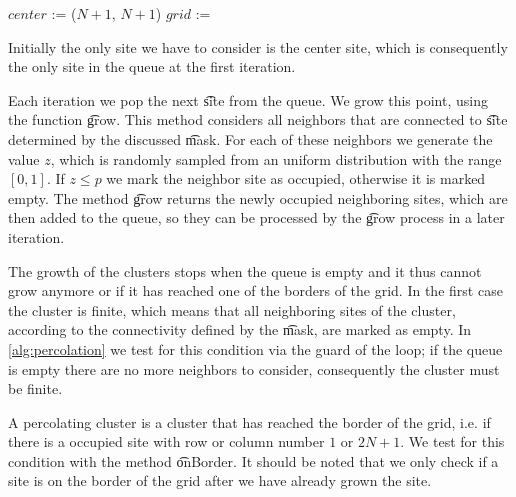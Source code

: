 \begin{algorithm}[t]
	\SetAlgoShortEnd
	\DontPrintSemicolon
	\BlankLine

	$center$ := ($N + 1$, $N + 1$)\; 
	\; 
	$grid$ := \; 

	\; 
	\caption{$(mask, N, p)$\label{alg:percolation}}
\end{algorithm}

Initially the only site we have to consider is the center site, which is consequently the only site in the queue at the first iteration.

Each iteration we pop the next \t{site} from the queue. We grow this point, using the function \t{grow}. This method considers all neighbors that are connected to \t{site} determined by the discussed \t{mask}. For each of these neighbors we generate the value $z$, which is randomly sampled from an uniform distribution with the range $[0,1]$. If $z \leq p$ we mark the neighbor site as occupied, otherwise it is marked empty. The method \t{grow} returns the newly occupied neighboring sites, which are then added to the queue, so they can be processed by the \t{grow} process in a later iteration.

The growth of the clusters stops when the queue is empty and it thus cannot grow anymore or if it has reached one of the borders of the grid. In the first case the cluster is finite, which means that all neighboring sites of the cluster, according to the connectivity defined by the \t{mask}, are marked as empty. In \cref{alg:percolation} we test for this condition via the guard of the loop; if the queue is empty there are no more neighbors to consider, consequently the cluster must be finite. 

A percolating cluster is a cluster that has reached the border of the grid, i.e. if there is a occupied site with row or column number $1$ or $2N + 1$. We test for this condition with the method \t{onBorder}. It should be noted that we only check if a site is on the border of the grid after we have already grown the site.\\

